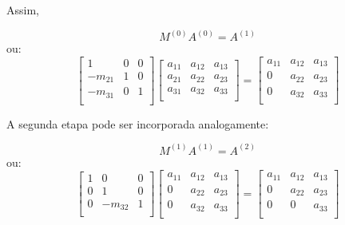 \documentclass[a4paper]{article}
\begin{document}
Assim, 

\begin{displaymath}
   M^{(0)}A^{(0)} = A^{(1)}
\end{displaymath}
ou:
\begin{displaymath}
  \begin{bmatrix}
    1 & 0 & 0 \\
    -m_{21} & 1 & 0 \\
    -m_{31} & 0 & 1 \\
  \end{bmatrix}
  \begin{bmatrix}
    a_{11} & a_{12} & a_{13} \\
    a_{21} & a_{22} & a_{23} \\
    a_{31} & a_{32} & a_{33} \\
  \end{bmatrix} = \begin{bmatrix}
    a_{11} & a_{12} & a_{13} \\
    0 & a_{22} & a_{23} \\
    0 & a_{32} & a_{33} \\
  \end{bmatrix}
\end{displaymath}

A segunda etapa pode ser incorporada analogamente:

\begin{displaymath}
   M^{(1)}A^{(1)} = A^{(2)}
\end{displaymath}
ou:
\begin{displaymath}
  \begin{bmatrix}
    1 & 0 & 0 \\
    0 & 1 & 0 \\
    0 & -m_{32} & 1 \\
  \end{bmatrix}
  \begin{bmatrix}
    a_{11} & a_{12} & a_{13} \\
    0 & a_{22} & a_{23} \\
    0 & a_{32} & a_{33} \\
  \end{bmatrix} = \begin{bmatrix}
    a_{11} & a_{12} & a_{13} \\
    0 & a_{22} & a_{23} \\
    0 & 0 & a_{33} \\
  \end{bmatrix}
\end{displaymath}
\end{document}
